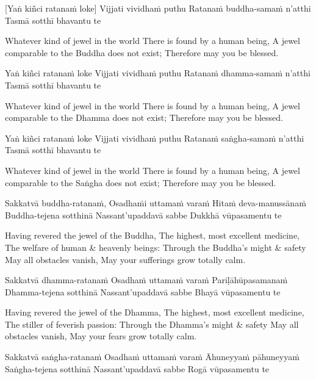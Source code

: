 \suttaRef{[SN 11.3]}

[Yaṅ kiñci ratanaṁ loke]
Vijjati vividhaṁ puthu
Ratanaṁ buddha-samaṁ n’atthi
Tasmā sotthī bhavantu te

\begin{english}
  Whatever kind of jewel in the world
  There is found by a human being,
  A jewel comparable to the Buddha does not exist;
  Therefore may you be blessed.
\end{english}

Yaṅ kiñci ratanaṁ loke
Vijjati vividhaṁ puthu
Ratanaṁ dhamma-samaṁ n’atthi
Tasmā sotthī bhavantu te

\begin{english}
  Whatever kind of jewel in the world
  There is found by a human being,
  A jewel comparable to the Dhamma does not exist;
  Therefore may you be blessed.
\end{english}

Yaṅ kiñci ratanaṁ loke
Vijjati vividhaṁ puthu
Ratanaṁ saṅgha-samaṁ n’atthi
Tasmā sotthī bhavantu te

\begin{english}
  Whatever kind of jewel in the world
  There is found by a human being,
  A jewel comparable to the Saṅgha does not exist;
  Therefore may you be blessed.
\end{english}

Sakkatvā buddha-ratanaṁ,
Osadhaṁi uttamaṁ varaṁ
Hitaṁ deva-manussānaṁ
Buddha-tejena sotthinā
Nassant’upaddavā sabbe
Dukkhā vūpasamentu te

\begin{english}
  Having revered the jewel of the Buddha,
  The highest, most excellent medicine,
  The welfare of human \& heavenly beings:
  Through the Buddha’s might \& safety
  May all obstacles vanish,
  May your sufferings grow totally calm.
\end{english}

Sakkatvā dhamma-ratanaṁ
Osadhaṁ uttamaṁ varaṁ
Pariḷāhūpasamanaṁ
Dhamma-tejena sotthinā
Nassant’upaddavā sabbe
Bhayā vūpasamentu te

\begin{english}
  Having revered the jewel of the Dhamma,
  The highest, most excellent medicine,
  The stiller of feverish passion:
  Through the Dhamma’s might \& safety
  May all obstacles vanish,
  May your fears grow totally calm.
\end{english}

Sakkatvā saṅgha-ratanaṁ
Osadhaṁ uttamaṁ varaṁ
Āhuneyyaṁ pāhuneyyaṁ
Saṅgha-tejena sotthinā
Nassant’upaddavā sabbe
Rogā vūpasamentu te


